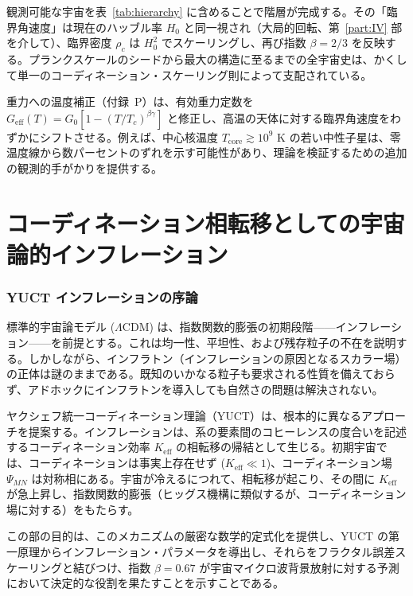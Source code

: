 \documentclass[11pt,a4paper]{article}
\newcommand{\Keff}{K_{\mathrm{eff}}}
\begin{document}
	観測可能な宇宙を表~\ref{tab:hierarchy} に含めることで階層が完成する。その「臨界角速度」は現在のハッブル率 \(H_0\) と同一視され（大局的回転、第~\ref{part:IV} 部を介して）、臨界密度 \(\rho_c\) は \(H_0^2\) でスケーリングし、再び指数 \(\beta=2/3\) を反映する。プランクスケールのシードから最大の構造に至るまでの全宇宙史は、かくして単一のコーディネーション・スケーリング則によって支配されている。
	
	重力への温度補正（付録~P）は、有効重力定数を \(G_{\mathrm{eff}}(T) = G_0[1 - (T/T_c)^{\beta\gamma}]\) と修正し、高温の天体に対する臨界角速度をわずかにシフトさせる。例えば、中心核温度 \(T_{\mathrm{core}} \gtrsim 10^9\) K の若い中性子星は、零温度線から数パーセントのずれを示す可能性があり、理論を検証するための追加の観測的手がかりを提供する。
	
	\part{コーディネーション相転移としての宇宙論的インフレーション}
	\label{part:III}
	
	\section{YUCT インフレーションの序論}
	\label{sec:intro-inflation}
	
	標準的宇宙論モデル (\(\Lambda\)CDM) は、指数関数的膨張の初期段階——インフレーション——を前提とする。これは均一性、平坦性、および残存粒子の不在を説明する。しかしながら、インフラトン（インフレーションの原因となるスカラー場）の正体は謎のままである。既知のいかなる粒子も要求される性質を備えておらず、アドホックにインフラトンを導入しても自然さの問題は解決されない。
	
	ヤクシェフ統一コーディネーション理論（YUCT）は、根本的に異なるアプローチを提案する。インフレーションは、系の要素間のコヒーレンスの度合いを記述するコーディネーション効率 \(\Keff\) の相転移の帰結として生じる。初期宇宙では、コーディネーションは事実上存在せず (\(\Keff \ll 1\))、コーディネーション場 \(\Psi_{MN}\) は対称相にある。宇宙が冷えるにつれて、相転移が起こり、その間に \(\Keff\) が急上昇し、指数関数的膨張（ヒッグス機構に類似するが、コーディネーション場に対する）をもたらす。
	
	この部の目的は、このメカニズムの厳密な数学的定式化を提供し、YUCT の第一原理からインフレーション・パラメータを導出し、それらをフラクタル誤差スケーリングと結びつけ、指数 \(\beta = 0.67\) が宇宙マイクロ波背景放射に対する予測において決定的な役割を果たすことを示すことである。
	
\end{document}
